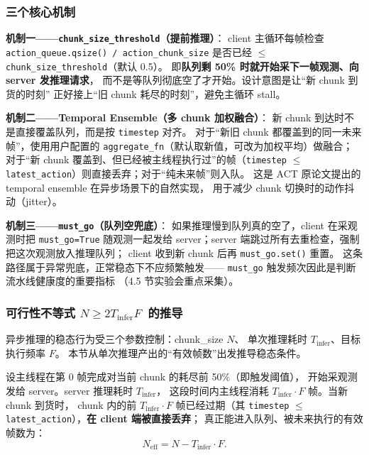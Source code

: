 \subsubsection{三个核心机制}\label{sec:async-inf-mechanisms}

\textbf{机制一——\texttt{chunk\_size\_threshold}（提前推理）}：
client 主循环每帧检查 \texttt{action\_queue.qsize() / action\_chunk\_size}
是否已经 $\leq$ \texttt{chunk\_size\_threshold}（默认 0.5）。
即\textbf{队列剩 50\% 时就开始采下一帧观测、向 server 发推理请求}，
而不是等队列彻底空了才开始。设计意图是让``新 chunk 到货的时刻''
正好接上``旧 chunk 耗尽的时刻''，避免主循环 stall。

\textbf{机制二——Temporal Ensemble（多 chunk 加权融合）}：
新 chunk 到达时不是直接覆盖队列，而是按 \texttt{timestep} 对齐。
对于``新旧 chunk 都覆盖到的同一未来帧''，使用用户配置的
\texttt{aggregate\_fn}（默认取新值，可改为加权平均）做融合；
对于``新 chunk 覆盖到、但已经被主线程执行过''的帧（\texttt{timestep} $\leq$
\texttt{latest\_action}）则直接丢弃；对于``纯未来帧''则入队。
这是 ACT 原论文提出的 temporal ensemble 在异步场景下的自然实现，
用于减少 chunk 切换时的动作抖动（jitter）。

\textbf{机制三——\texttt{must\_go}（队列空兜底）}：
如果推理慢到队列真的空了，client 在采观测时把 \texttt{must\_go=True}
随观测一起发给 server；server 端跳过所有去重检查，强制把这次观测放入推理队列；
client 收到新 chunk 后再 \texttt{must\_go.set()} 重置。
这条路径属于异常兜底，正常稳态下不应频繁触发——
\texttt{must\_go} 触发频次因此是判断流水线健康度的重要指标
（4.5 节实验会重点采集）。

\subsubsection{可行性不等式 \boldmath$N \geq 2 T_{\text{infer}} F$\unboldmath\ 的推导}\label{sec:async-inf-inequality}

异步推理的稳态行为受三个参数控制：chunk\_size $N$、
单次推理耗时 $T_{\text{infer}}$、目标执行频率 $F$。
本节从单次推理产出的``有效帧数''出发推导稳态条件。

设主线程在第 0 帧完成对当前 chunk 的耗尽前 50\%（即触发阈值），
开始采观测发给 server。server 推理耗时 $T_{\text{infer}}$，
这段时间内主线程消耗 $T_{\text{infer}} \cdot F$ 帧。当新 chunk 到货时，
chunk 内的前 $T_{\text{infer}} \cdot F$ 帧已经过期（其 \texttt{timestep}
$\leq$ \texttt{latest\_action}），\textbf{在 client 端被直接丢弃}；
真正能进入队列、被未来执行的有效帧数为：
\begin{equation}
  N_{\text{eff}} = N - T_{\text{infer}} \cdot F.
\end{equation}

